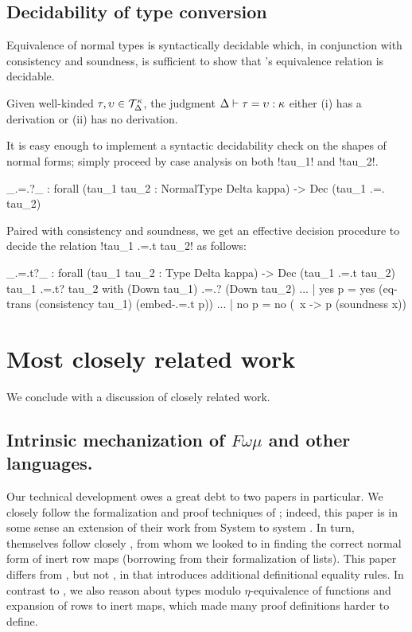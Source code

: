 \documentclass[sigplan,10pt,anonymous,review]{acmart}\settopmatter{printfolios=true,printccs=false,printacmref=false}
\begin{document}
\subsection{Decidability of type conversion}

Equivalence of normal types is syntactically decidable which, in conjunction with consistency and soundness, is sufficient to show that \Rome's equivalence relation is decidable.

\ifthms
\begin{theorem}[Decidability]
  Given well-kinded $\tau, \upsilon \in {\mathcal T}_{\Delta}^{\kappa}$, the judgment $\Delta \vdash \tau = \upsilon : \kappa$ either (i) has a derivation or (ii) has no derivation.
\end{theorem}\fi

It is easy enough to implement a syntactic decidability check on the shapes of normal forms; simply proceed by case analysis on both !tau_1! and !tau_2!.

\begin{agda}
_.=.?_ : forall (tau_1 tau_2 : NormalType Delta kappa) -> Dec (tau_1 .=. tau_2)
\end{agda}

Paired with consistency and soundness, we get an effective decision procedure to decide the relation !tau_1 .=.t tau_2! as follows: 

\begin{agda}
_.=.t?_ : forall (tau_1 tau_2 : Type Delta kappa) -> Dec (tau_1 .=.t tau_2)
tau_1 .=.t? tau_2  with (Down tau_1) .=.? (Down tau_2)
... | yes p = yes 
    (eq-trans 
        (consistency tau_1) 
        (embed-.=.t p))
... | no  p = no (\ x -> p (soundness x))
\end{agda}


\section{Most closely related work}
\label{sec:related-work} 

We conclude with a discussion of closely related work. 

\subsection{Intrinsic mechanization of $F\omega\mu$ and other languages.} Our technical development owes a great debt to two papers in particular. We closely follow the formalization and proof techniques of \citet{ChapmanKNW19}; indeed, this paper is in some sense an extension of their work from System \Fome to system \Rome. In turn, \citet{ChapmanKNW19} themselves follow closely \citet{AllaisBM13}, from whom we looked to in finding the correct normal form of inert row maps (borrowing from their formalization of lists). This paper differs from \citet{ChapmanKNW19}, but not \citet{AllaisBM13}, in that \Rome introduces additional definitional equality rules. In contrast to \citet{ChapmanKNW19}, we also reason about types modulo $\eta$-equivalence of functions and expansion of rows to inert maps, which made many proof definitions harder to define.
\end{document}

